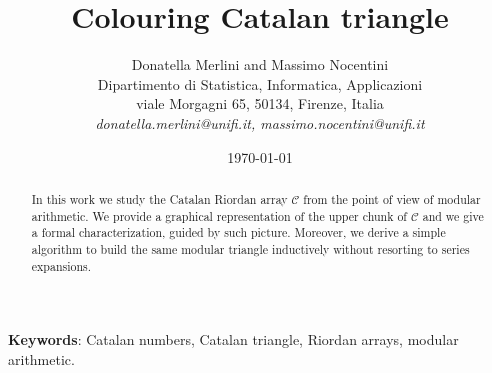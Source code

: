 \documentclass[11pt,a4paper]{article} %
\begin{document}

    \title{Colouring Catalan triangle}
    \author{Donatella Merlini and Massimo Nocentini\\
        Dipartimento di Statistica, Informatica, Applicazioni \\ 
        viale Morgagni 65, 50134, Firenze, Italia \\ 
        {\sl donatella.merlini@unifi.it, massimo.nocentini@unifi.it}}


    \date{\today} 
    
    \maketitle
    
    \begin{abstract}
        In this work we study the Catalan Riordan array $\mathcal{C}$ from the
        point of view of modular arithmetic. We provide a graphical
        representation of the upper chunk of $\mathcal{C}$ and we give
        a formal characterization, guided by such picture. Moreover, 
        we derive a simple algorithm to build the same modular triangle
        inductively without resorting to series expansions.
    \end{abstract}
       
    {\noindent\textbf{Keywords}: Catalan numbers, Catalan triangle, Riordan arrays, modular arithmetic.}


    
    
    
    
    

    \newpage
    
    

\end{document}
